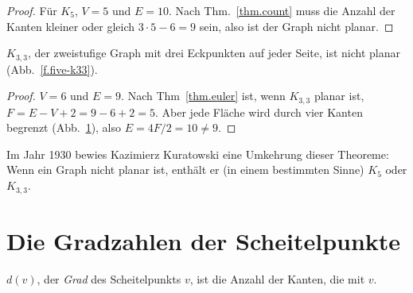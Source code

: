 \begin{proof}
Für $K_5$, $V=5$ und $E=10$. Nach Thm.~\ref{thm.count} muss die Anzahl der Kanten kleiner oder gleich $3\cdot 5 -6=9$ sein, also ist der Graph nicht planar.
\end{proof}

\begin{theorem}
$K_{3,3}$, der zweistufige Graph mit drei Eckpunkten auf jeder Seite, ist nicht planar (Abb.~\ref{f.five-k33}).
\end{theorem}

\begin{figure}[b]
\subfigures
{}
\hfill
{}
\label{f.five-k33}
\label{f.five-k33-failed}
\end{figure}

\begin{proof}
$V=6$ und $E=9$. Nach Thm~\ref{thm.euler} ist, wenn $K_{3,3}$ planar ist, $F=E-V+2=9-6+2=5$. Aber jede Fläche wird durch vier Kanten begrenzt (Abb.~\ref{f.five-k33-failed}), also $E=4F/2=10\neq 9$.
\end{proof}

Im Jahr 1930 bewies Kazimierz Kuratowski eine Umkehrung dieser Theoreme: Wenn ein Graph nicht planar ist, enthält er (in einem bestimmten Sinne) $K_5$ oder $K_{3,3}$.

\section{Die Gradzahlen der Scheitelpunkte}\label{s.degrees}

\begin{definition}
$d(v)$, der \emph{Grad} des Scheitelpunkts $v$, ist die Anzahl der Kanten, die mit $v$.
\end{definition}

